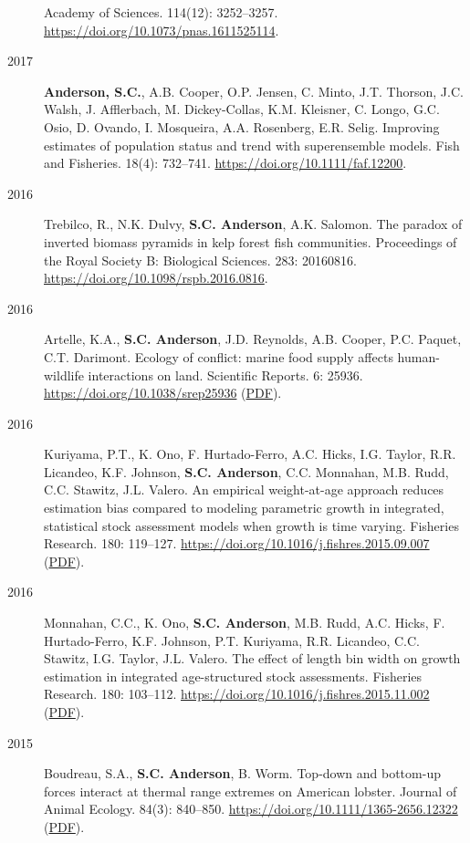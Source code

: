 \begin{description}
Academy of Sciences. 114(12): 3252--3257.
\url{https://doi.org/10.1073/pnas.1611525114}.
\item[2017]
\textbf{Anderson, S.C.}, A.B. Cooper, O.P. Jensen, C. Minto, J.T.
Thorson, J.C. Walsh, J. Afflerbach, M. Dickey-Collas, K.M. Kleisner, C.
Longo, G.C. Osio, D. Ovando, I. Mosqueira, A.A. Rosenberg, E.R. Selig.
Improving estimates of population status and trend with superensemble
models. Fish and Fisheries. 18(4): 732--741.
\url{https://doi.org/10.1111/faf.12200}.
\item[2016]
Trebilco, R., N.K. Dulvy, \textbf{S.C. Anderson}, A.K. Salomon. The
paradox of inverted biomass pyramids in kelp forest fish communities.
Proceedings of the Royal Society B: Biological Sciences. 283: 20160816.
\url{https://doi.org/10.1098/rspb.2016.0816}.
\item[2016]
Artelle, K.A., \textbf{S.C. Anderson}, J.D. Reynolds, A.B. Cooper, P.C.
Paquet, C.T. Darimont. Ecology of conflict: marine food supply affects
human-wildlife interactions on land. Scientific Reports. 6: 25936.
\url{https://doi.org/10.1038/srep25936}
(\href{http://www.nature.com/articles/srep25936.pdf}{PDF}).
\item[2016]
Kuriyama, P.T., K. Ono, F. Hurtado-Ferro, A.C. Hicks, I.G. Taylor, R.R.
Licandeo, K.F. Johnson, \textbf{S.C. Anderson}, C.C. Monnahan, M.B.
Rudd, C.C. Stawitz, J.L. Valero. An empirical weight-at-age approach
reduces estimation bias compared to modeling parametric growth in
integrated, statistical stock assessment models when growth is time
varying. Fisheries Research. 180: 119--127.
\url{https://doi.org/10.1016/j.fishres.2015.09.007}
(\href{https://www.dropbox.com/s/425a18a4xm9kq8l/Kuriyama_etal_2016_empirical.pdf?dl=1}{PDF}).
\item[2016]
Monnahan, C.C., K. Ono, \textbf{S.C. Anderson}, M.B. Rudd, A.C. Hicks,
F. Hurtado-Ferro, K.F. Johnson, P.T. Kuriyama, R.R. Licandeo, C.C.
Stawitz, I.G. Taylor, J.L. Valero. The effect of length bin width on
growth estimation in integrated age-structured stock assessments.
Fisheries Research. 180: 103--112.
\url{https://doi.org/10.1016/j.fishres.2015.11.002}
(\href{https://www.dropbox.com/s/uksmdtptby9w0ku/Monnahan_etal_2016_binwidth.pdf?dl=1}{PDF}).
\item[2015]
Boudreau, S.A., \textbf{S.C. Anderson}, B. Worm. Top-down and bottom-up
forces interact at thermal range extremes on American lobster. Journal
of Animal Ecology. 84(3): 840--850.
\url{https://doi.org/10.1111/1365-2656.12322}
(\href{https://www.dropbox.com/s/w027swfx2o8hgvl/Boudreau_etal_2015_lobster.pdf?dl=1}{PDF}).

\end{description}
